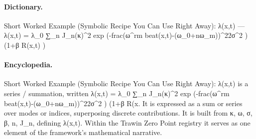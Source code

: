 \paragraph{Dictionary.}
Short Worked Example (Symbolic Recipe You Can Use Right Away): λ(x,t) — λ(x,t) = λ\_0 ∑\_n J\_n(κ)\textasciicircum{}2 exp (-frac(ω\textasciicircum{}rm beat(x,t)-(ω\_0+nω\_m))\textasciicircum{}22σ\textasciicircum{}2 ) (1+β R(x,t) )

\paragraph{Encyclopedia.}
Short Worked Example (Symbolic Recipe You Can Use Right Away): λ(x,t) is a series / summation, written λ(x,t) = λ\_0 ∑\_n J\_n(κ)\textasciicircum{}2 exp (-frac(ω\textasciicircum{}rm beat(x,t)-(ω\_0+nω\_m))\textasciicircum{}22σ\textasciicircum{}2 ) (1+β R(x. It is expressed as a sum or series over modes or indices, superposing discrete contributions. It is built from κ, ω, σ, β, n, J\_n, defining λ(x,t). Within the Trawin Zero Point registry it serves as one element of the framework's mathematical narrative.
